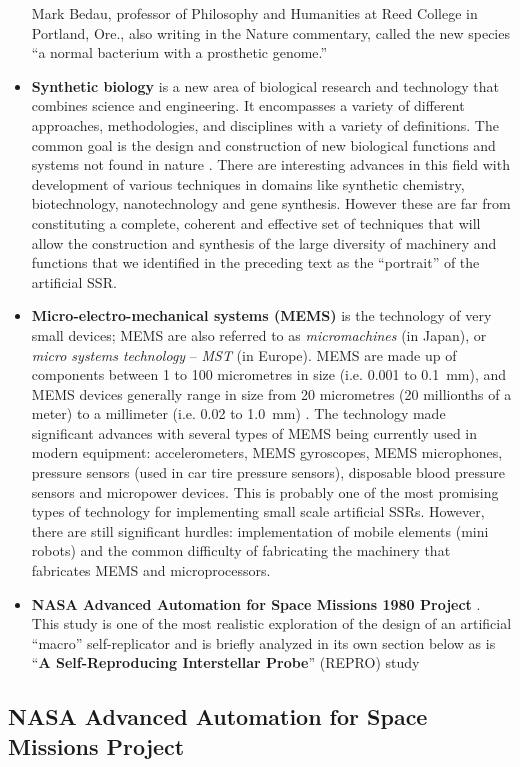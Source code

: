 \begin{itemize}
Mark Bedau, professor of Philosophy and
Humanities at Reed College in Portland, Ore., also writing in the
Nature commentary, called the new species ``a normal
bacterium with a prosthetic genome.'' 
\item \textbf{Synthetic
biology} is a new area of biological
research and technology that combines science and engineering. It
encompasses a variety of different approaches, methodologies, and
disciplines with a variety of definitions. The common goal is the
design and construction of new biological functions and systems not
found in nature . There are interesting advances in this field with
development of various techniques in domains like synthetic chemistry,
biotechnology, nanotechnology and gene synthesis. However these are far
from constituting a complete, coherent and effective set of techniques
that will allow the construction and synthesis of the large diversity
of machinery and functions that we identified in the preceding text as
the “portrait” of the artificial SSR.
\item \textbf{Micro-electro-mechanical systems (MEMS)} is the technology
of very small devices; MEMS are also referred to as
\textit{micromachines} (in Japan), or \textit{micro systems technology}
– \textit{MST} (in Europe). MEMS are made up of components between 1 to
100 micrometres in size (i.e. 0.001 to 0.1~mm), and MEMS devices
generally range in size from 20 micrometres (20 millionths of a meter)
to a millimeter (i.e. 0.02 to 1.0~mm) . The technology made significant
advances with several types of MEMS being currently used in modern
equipment:  accelerometers, MEMS gyroscopes, MEMS microphones, pressure
sensors (used in car tire pressure sensors), disposable blood pressure
sensors and micropower devices. This is probably one of the most
promising types of technology for implementing small scale artificial
SSRs. However, there are still significant hurdles: implementation of
mobile elements (mini robots) and the common difficulty of fabricating
the machinery that fabricates MEMS and microprocessors.
\item \textbf{NASA Advanced Automation for Space Missions 1980 Project}
. This study is one of the most realistic exploration of the design of
an artificial ``macro'' self-replicator and is briefly analyzed in its
own section below as is ``\textbf{A Self-Reproducing Interstellar
Probe}'' (REPRO) study 
\end{itemize}

\subsection[NASA Advanced Automation for Space Missions Project]{NASA
Advanced Automation for Space Missions Project}

